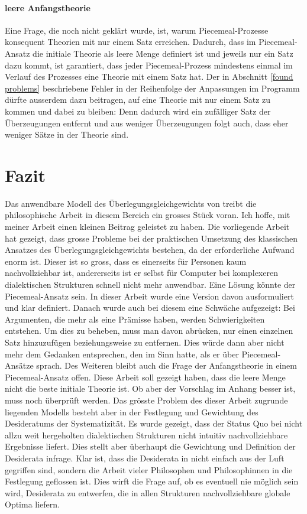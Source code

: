 \documentclass{article}
\begin{document}
\paragraph{leere Anfangstheorie} Eine Frage, die noch nicht geklärt wurde, ist, warum Piecemeal-Prozesse konsequent Theorien mit nur einem Satz erreichen. Dadurch, dass im Piecemeal-Ansatz die initiale Theorie als leere Menge definiert ist und jeweils nur ein Satz dazu kommt, ist garantiert, dass jeder Piecemeal-Prozess mindestens einmal im Verlauf des Prozesses eine Theorie mit einem Satz hat. Der in Abschnitt \ref{found problems} beschriebene Fehler in der Reihenfolge der Anpassungen im Programm dürfte ausserdem dazu beitragen, auf eine Theorie mit nur einem Satz zu kommen und dabei zu bleiben: Denn dadurch wird ein zufälliger Satz der Überzeugungen entfernt und aus weniger Überzeugungen folgt auch, dass eher weniger Sätze in der Theorie sind.

\section{Fazit}
Das anwendbare Modell des Überlegungsgleichgewichts von \citeauthor{beisbart_making_2021} treibt die philosophische Arbeit in diesem Bereich ein grosses Stück voran. Ich hoffe, mit meiner Arbeit einen kleinen Beitrag geleistet zu haben. Die vorliegende Arbeit hat gezeigt, dass grosse Probleme bei der praktischen Umsetzung des klassischen Ansatzes des Überlegungsgleichgewichts bestehen, da der erforderliche Aufwand enorm ist. Dieser ist so gross, dass es einerseits für Personen kaum nachvollziehbar ist, andererseits ist er selbst für Computer bei komplexeren dialektischen Strukturen schnell nicht mehr anwendbar. Eine Lösung könnte der Piecemeal-Ansatz sein. In dieser Arbeit wurde eine Version davon ausformuliert und klar definiert. Danach wurde auch bei diesem eine Schwäche aufgezeigt: Bei Argumenten, die mehr als eine Prämisse haben, werden Schwierigkeiten entstehen. Um dies zu beheben, muss man davon abrücken, nur einen einzelnen Satz hinzuzufügen beziehungsweise zu entfernen. Dies würde dann aber nicht mehr dem Gedanken entsprechen, den \cite{goodman_fact_1983} im Sinn hatte, als er über Piecemeal-Ansätze sprach. Des Weiteren bleibt auch die Frage der Anfangstheorie in einem Piecemeal-Ansatz offen. Diese Arbeit soll gezeigt haben, dass die leere Menge nicht die beste initiale Theorie ist. Ob aber der Vorschlag im Anhang besser ist, muss noch überprüft werden.
Das grösste Problem des dieser Arbeit zugrunde liegenden Modells besteht aber in der Festlegung und Gewichtung des Desideratums der Systematizität. Es wurde gezeigt, dass der Status Quo bei nicht allzu weit hergeholten dialektischen Strukturen nicht intuitiv nachvollziehbare Ergebnisse liefert. Dies stellt aber überhaupt die Gewichtung und Definition der Desiderata infrage. Klar ist, dass die Desiderata in \cite{beisbart_making_2021} nicht einfach aus der Luft gegriffen sind, sondern die Arbeit vieler Philosophen und Philosophinnen in die Festlegung geflossen ist. Dies wirft die Frage auf, ob es eventuell nie möglich sein wird, Desiderata zu entwerfen, die in allen Strukturen nachvollziehbare globale Optima liefern.
\end{document}

